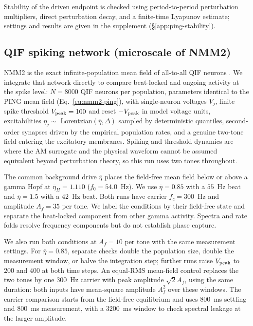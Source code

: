 \documentclass[11pt,a4paper]{article}
\providecommand{\DIFaddbegin}{} %
\providecommand{\DIFaddend}{} %
\begin{document}
\DIFaddbegin \fi

\DIFaddend Stability of the driven endpoint is checked using period-to-period perturbation
multipliers, direct perturbation decay, and a finite-time Lyapunov estimate;
settings and results are given in the supplement (\S\ref{app:ping-stability}).

\subsection{QIF spiking network (microscale of NMM2)}\label{sec:qif-methods}
NMM2 is the exact infinite-population mean field of all-to-all QIF neurons
\cite{montbrio2015,ruffini2025rosetta,clusella2023}. We integrate that network directly
to compare beat-locked and ongoing activity at the spike level: $N=8000$ QIF neurons per
population, parameters identical to the PING mean field (Eq.~\eqref{eq:nmm2-ping}),
with single-neuron voltages $V_j$, finite spike threshold $V_{\rm peak}=100$ and reset $-V_{\rm peak}$ in model
voltage units, excitabilities $\eta_j\sim$ Lorentzian$(\bar\eta,\Delta)$ sampled by deterministic
quantiles, second-order synapses driven by the empirical population rates, and a genuine
two-tone field entering the excitatory membranes. Spiking and threshold dynamics are
where the AM surrogate and the physical waveform cannot be assumed equivalent beyond
perturbation theory, so this run uses two tones throughout.

The common background drive $\bar\eta$ places the field-free mean field below or
above a gamma Hopf at $\bar\eta_H=1.110$ ($f_0=54.0$~Hz). We use
$\bar\eta=0.85$ with a $55$~Hz beat and $\bar\eta=1.5$ with a $42$~Hz beat.
Both runs have carrier $f_c=300$~Hz and amplitude $A_f=35$ per tone. We label the conditions by their field-free state and separate the beat-locked
component from other gamma activity. Spectra and rate folds resolve frequency components but do not establish
phase capture.

We also run both conditions at $A_f=10$ per tone with the same measurement
settings. For $\bar\eta=0.85$, separate checks double the population size,
double the measurement window, or halve the integration step; further runs raise
$V_{\rm peak}$ to $200$ and $400$ at both time steps. An equal-RMS
mean-field control replaces the two tones by one $300$~Hz carrier with peak
amplitude $\sqrt{2}A_f$, using the same duration: both inputs have mean-square
amplitude $A_f^2$ over these windows. The carrier comparison starts from the
field-free equilibrium and uses $800$~ms settling and $800$~ms measurement,
with a $3200$~ms window to check spectral leakage at the larger amplitude.
\end{document}
